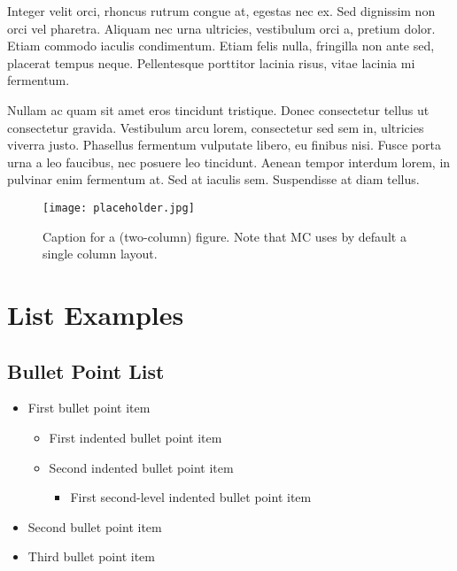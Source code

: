 \documentclass{mathcryptology} %
\begin{document}
Integer velit orci, rhoncus rutrum congue at, egestas nec ex. Sed dignissim non orci vel pharetra. Aliquam nec urna ultricies, vestibulum orci a, pretium dolor. Etiam commodo iaculis condimentum. Etiam felis nulla, fringilla non ante sed, placerat tempus neque. Pellentesque porttitor lacinia risus, vitae lacinia mi fermentum.

Nullam ac quam sit amet eros tincidunt tristique. Donec consectetur tellus ut consectetur gravida. Vestibulum arcu lorem, consectetur sed sem in, ultricies viverra justo. Phasellus fermentum vulputate libero, eu finibus nisi. Fusce porta urna a leo faucibus, nec posuere leo tincidunt. Aenean tempor interdum lorem, in pulvinar enim fermentum at. Sed at iaculis sem. Suspendisse at diam tellus.

\begin{figure*} %
	\centering %
	\texttt{[image: placeholder.jpg]}
	\caption{Caption for a (two-column) figure. Note that MC uses by default a single column layout.}
	\label{fig:twocolumn} %
\end{figure*}


\section{List Examples}

\subsection{Bullet Point List}

\begin{itemize}
	\item First bullet point item
	\begin{itemize}
		\item First indented bullet point item
		\item Second indented bullet point item
		\begin{itemize}
			\item First second-level indented bullet point item
		\end{itemize}
	\end{itemize}
	\item Second bullet point item
	\item Third bullet point item
\end{itemize}
\end{document}
